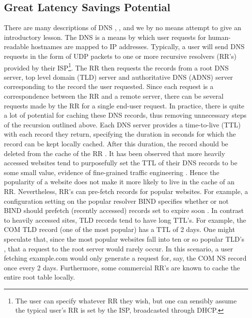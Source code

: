 \documentclass[sigconf,nonacm,10pt]{acmart}
\begin{document}
\subsection{Great Latency Savings
Potential}\label{great-latency-savings-potential-1}

There are many descriptions of DNS \cite{kurose2010computer},
\cite{cloudflare_dns_tutorial}, and we by no means attempt to give an
introductory lesson. The DNS is a means by which user requests for
human-readable hostnames are mapped to IP addresses. Typically, a user
will send DNS requests in the form of UDP packets to one or more
recursive resolvers (RR's) provided by their
ISP\footnote{ The user can specify whatever RR they wish, but one can sensibly assume the typical user's RR is set by the ISP, broadcasted through DHCP. }.
The RR then requests the records from a root DNS server, top level
domain (TLD) server and authoritative DNS (ADNS) server corresponding to
the record the user requested. Since each request is a correspondence
between the RR and a remote server, there can be several requests made
by the RR for a single end-user request. \break \break
In practice, there is quite a lot of potential for caching these DNS
records, thus removing unnecessary steps of the recursion outlined
above. Each DNS server provides a time-to-live (TTL) with each record
they return, specifying the duration in seconds for which the record can
be kept locally cached. After this duration, the record should be
deleted from the cache of the RR \cite{rfc_1035}. It has been observed
that more heavily accessed websites tend to purposefully set the TTL of
their DNS records to be some small value, evidence of fine-grained
traffic engineering \cite{callahan2013modern}. Hence the popularity of a
website does not make it more likely to live in the cache of an RR.
Nevertheless, RR's can pre-fetch records for popular websites. For
example, a configuration setting on the popular resolver BIND specifies
whether or not BIND should prefetch (recently accessed) records set to
expire soon \cite{bind9_config}. In contrast to heavily accessed sites,
TLD records tend to have long TTL's. For example, the COM TLD record
(one of the most popular) has a TTL of 2 days. One might speculate that,
since the most popular websites fall into ten or so popular TLD's
\cite{alexa_topsites}, that a request to the root server would rarely
occur. In this scenario, a user fetching example.com would only generate
a request for, say, the COM NS record once every 2 days. Furthermore,
some commercial RR's are known to cache the entire root table locally.
\end{document}

